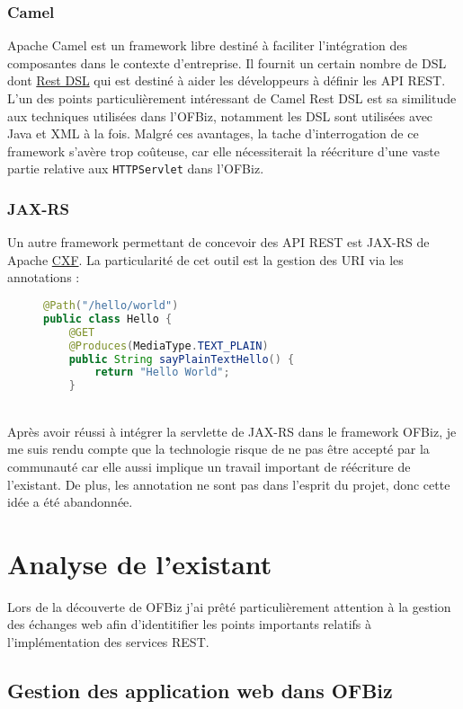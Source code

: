 \subsubsection{Camel}
Apache Camel est un framework libre destiné à faciliter l'intégration des composantes dans le contexte d'entreprise. Il fournit un certain nombre de DSL dont \href{https://camel.apache.org/rest-dsl.html}{Rest DSL} qui est destiné à aider les développeurs à définir les API REST. 
L'un des points particulièrement intéressant de Camel Rest DSL est sa similitude aux techniques utilisées dans l'OFBiz, notamment les DSL sont utilisées avec Java et XML à la fois. 
Malgré ces avantages, la tache d'interrogation de ce framework s'avère trop coûteuse, car elle nécessiterait la réécriture d'une vaste partie relative aux \verb|HTTPServlet| dans l'OFBiz. 
\subsubsection{JAX-RS}
Un autre framework permettant de concevoir des API REST est JAX-RS de Apache \href{http://cxf.apache.org/}{CXF}. La particularité de cet outil est la gestion des URI via les annotations : 
\begin{figure}[h!]
	\begin{lstlisting}[language=Java,frame=leftline]
@Path("/hello/world")
public class Hello {	
	@GET
	@Produces(MediaType.TEXT_PLAIN)
	public String sayPlainTextHello() {
		return "Hello World";
	}
	\end{lstlisting}
\end{figure}\\
Après avoir réussi à intégrer la servlette de JAX-RS dans le framework OFBiz, 
je me suis rendu compte que la technologie risque de ne pas être accepté par la communauté  car elle aussi implique un travail important de réécriture de l'existant. De plus, les annotation ne sont pas dans l'esprit du projet, donc cette idée a été abandonnée. 

\section{Analyse de l'existant}

Lors de la découverte de OFBiz j'ai prêté particulièrement attention à la gestion des échanges web afin d'identitifier les points importants relatifs à l'implémentation des services REST. 


\subsection{Gestion des application web dans OFBiz}


